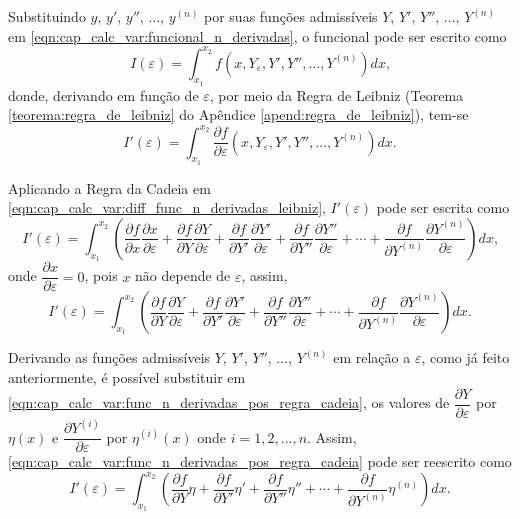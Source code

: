 \documentclass[
	12pt,				%
	openright,			%
    twoside,			%
	a4paper,			%
	chapter=TITLE,		%
	english,			%
	french,				%
	spanish,			%
	brazil				%
	]{abntex2}
\numberwithin{lema}{chapter}
\numberwithin{teorema}{chapter}
\numberwithin{definicao}{chapter}
\numberwithin{exemplo}{chapter}
\numberwithin{figure}{chapter}
\begin{document}
Substituindo $y$, $y'$, $y''$, $\dots$, $y^{(n)}$ por suas funções admissíveis $Y$, $Y'$, $Y''$, $\dots$, $Y^{(n)}$ em \eqref{eqn:cap_calc_var:funcional_n_derivadas}, o funcional pode ser escrito como
$$
	I(\varepsilon) = \int_{x_1}^{x_2}
		f(x, Y_{\varepsilon}, Y', Y'', \dots, Y^{(n)})
		dx
	\text{,}
$$
donde, derivando em função de $\varepsilon$, por meio da Regra de Leibniz (Teorema \ref{teorema:regra_de_leibniz} do Apêndice \ref{apend:regra_de_leibniz}), tem-se
\begin{equation}
	\label{eqn:cap_calc_var:diff_func_n_derivadas_leibniz}
	I'(\varepsilon) = 
	\int_{x_1}^{x_2}
		\frac{\partial f}{\partial \varepsilon}
		(x, Y_{\varepsilon}, Y', Y'', \dots, Y^{(n)})
		dx
	\text{.}
\end{equation}

Aplicando a Regra da Cadeia em \eqref{eqn:cap_calc_var:diff_func_n_derivadas_leibniz}, $I'(\varepsilon)$ pode ser escrita como
$$
	I'(\varepsilon)=\int_{x_1}^{x_2}
	\left (
		\frac{\partial f}{\partial x}
		\frac{\partial x}{\partial \varepsilon}
		+
		\frac{\partial f}{\partial Y}
		\frac{\partial Y}{\partial \varepsilon}
		+
		\frac{\partial f}{\partial Y'}
		\frac{\partial Y'}{\partial \varepsilon}
		+
		\frac{\partial f}{\partial Y''}
		\frac{\partial Y''}{\partial \varepsilon}
		+
		\cdots
		+
		\frac{\partial f}{\partial Y^{(n)}}
		\frac{\partial Y^{(n)}}{\partial \varepsilon}
	\right ) dx
	\text{,}
$$
onde $\dfrac{\partial x}{\partial \varepsilon} = 0$, pois $x$ não depende de $\varepsilon$, assim,
\begin{equation}
	\label{eqn:cap_calc_var:func_n_derivadas_pos_regra_cadeia}
	I'(\varepsilon)=\int_{x_1}^{x_2}
	\left (
		\frac{\partial f}{\partial Y}
		\frac{\partial Y}{\partial \varepsilon}
		+
		\frac{\partial f}{\partial Y'}
		\frac{\partial Y'}{\partial \varepsilon}
		+
		\frac{\partial f}{\partial Y''}
		\frac{\partial Y''}{\partial \varepsilon}
		+
		\cdots
		+
		\frac{\partial f}{\partial Y^{(n)}}
		\frac{\partial Y^{(n)}}{\partial \varepsilon}
	\right ) dx
	\text{.}
\end{equation}

Derivando as funções admissíveis $Y$, $Y'$, $Y''$, $\dots$, $Y^{(n)}$ em relação a $\varepsilon$, como já feito anteriormente, é possível substituir em \eqref{eqn:cap_calc_var:func_n_derivadas_pos_regra_cadeia}, os valores de $\dfrac{\partial Y}{\partial \varepsilon}$ por $\eta(x)$ e $\dfrac{\partial Y^{(i)}}{\partial \varepsilon}$ por $\eta^{(i)}(x)$ onde $i=1, 2, \dots, n$. Assim, \eqref{eqn:cap_calc_var:func_n_derivadas_pos_regra_cadeia} pode ser reescrito como
\begin{equation}
	\label{eqn:cap_calc_var:func_n_derivadas_replace_0}
	I'(\varepsilon)=
	\int_{x_1}^{x_2} \left (
		\frac{\partial f}{\partial Y} \eta
		+
		\frac{\partial f}{\partial Y'} \eta'
		+
		\frac{\partial f}{\partial Y''} \eta''
		+
		\cdots
		+
		\frac{\partial f}{\partial Y^{(n)}} \eta^{(n)}
	\right ) dx
	\text{.}
\end{equation}
\end{document}
